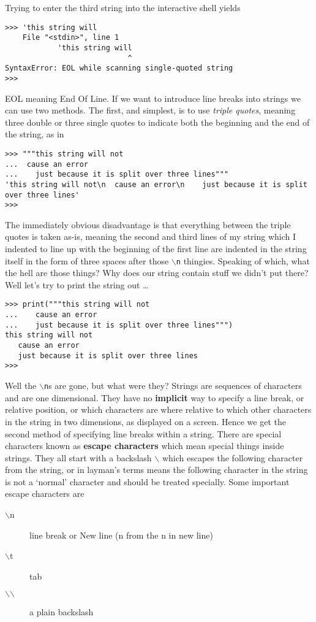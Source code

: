 Trying to enter the third string into the interactive shell yields
\begin{lstlisting}
>>> 'this string will
    File "<stdin>", line 1
            'this string will
                            ^
SyntaxError: EOL while scanning single-quoted string
>>>
\end{lstlisting}

EOL meaning End Of Line. If we want to introduce line breaks into   strings we can use two methods. The first, and simplest, is to use   \textit{triple quotes}, meaning three double or three single quotes to indicate   both the beginning and the end of the string, as in
\begin{lstlisting}
>>> """this string will not
...  cause an error
...    just because it is split over three lines"""
'this string will not\n  cause an error\n    just because it is split over three lines'
>>>
\end{lstlisting}

The immediately obvious disadvantage is that everything between the   triple quotes is taken as-is, meaning the second and third lines of my   string which I indented to line up with the beginning of the first line   are indented in the string itself in the form of three spaces after   those \texttt{$\backslash$n} thingies. Speaking of which, what the hell are those things?   Why does our string contain stuff we didn't put there? Well let's try   to print the string out \ldots
\begin{lstlisting}
>>> print("""this string will not
...    cause an error
...    just because it is split over three lines""")
this string will not
   cause an error
   just because it is split over three lines
>>>
\end{lstlisting}

Well the \texttt{$\backslash$n}s are gone, but what were they? Strings are sequences   of characters and are one dimensional. They have no   \textbf{implicit} way to specify a line break, or relative   position, or which characters are where relative to which other   characters in the string in two dimensions, as displayed on a screen.   Hence we get the second method of specifying line breaks within a   string. There are special characters known as \textbf{escape     characters} which mean special things inside strings. They all   start with a backslash \texttt{$\backslash$} which escapes the following character from   the string, or in layman's terms means the following character in the   string is not a `normal' character and should be treated specially.   Some important escape characters are
\begin{description}
	\item[$\backslash$n] line break or New line (n from the n in new line)
	\item[$\backslash$t] tab
	\item[$\backslash$$\backslash$] a plain backslash
\end{description}

